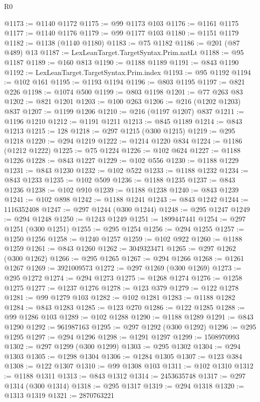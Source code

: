 \begin{lexlean}{R0}
\begin{coremodule}
@1173 := @1140 @1172
@1175 := @99 @1173 @103
@1176 := @1161 @1175
@1177 := @1140 @1176
@1179 := @99 @1177 @103
@1180 := @1151 @1179
@1182 := @1138 (@1140 @1180)
@1183 := @75 @1182
@1186 := @201 (@87 @489) @13
@1187 := LexLeanTarget.TargetSyntax.Prim.natLt
@1188 := @95 @1187
@1189 := @160 @813
@1190 := @1188 @1189
@1191 := @843 @1190
@1192 := LexLeanTarget.TargetSyntax.Prim.index
@1193 := @95 @1192
@1194 := @102 @161
@1195 := @1193 @1194
@1196 := @803 @1195
@1197 := @821 @226
@1198 := @1074 @500
@1199 := @803 @1198
@1201 := @77 @263 @83
@1202 := @821 @1201
@1203 := @100 @263
@1206 := @216 (@1202 @1203) @837
@1207 := @1199 @1206
@1210 := @216 (@1197 @1207) @837
@1211 := @1196 @1210
@1212 := @1191 @1211
@1213 := @845 @1189
@1214 := @843 @1213
@1215 := 128
@1218 := @297 @1215 (@300 @1215)
@1219 := @295 @1218
@1220 := @294 @1219
@1222 := @1214 @1220 @834
@1224 := @1186 (@1212 @1222)
@1225 := @75 @1224
@1226 := @102 @624
@1227 := @1188 @1226
@1228 := @843 @1227
@1229 := @102 @556
@1230 := @1188 @1229
@1231 := @843 @1230
@1232 := @102 @522
@1233 := @1188 @1232
@1234 := @843 @1233
@1235 := @102 @509
@1236 := @1188 @1235
@1237 := @843 @1236
@1238 := @102 @910
@1239 := @1188 @1238
@1240 := @843 @1239
@1241 := @102 @898
@1242 := @1188 @1241
@1243 := @843 @1242
@1244 := 1116352408
@1247 := @297 @1244 (@300 @1244)
@1248 := @295 @1247
@1249 := @294 @1248
@1250 := @1243 @1249
@1251 := 1899447441
@1254 := @297 @1251 (@300 @1251)
@1255 := @295 @1254
@1256 := @294 @1255
@1257 := @1250 @1256
@1258 := @1240 @1257
@1259 := @102 @922
@1260 := @1188 @1259
@1261 := @843 @1260
@1262 := 3049323471
@1265 := @297 @1262 (@300 @1262)
@1266 := @295 @1265
@1267 := @294 @1266
@1268 := @1261 @1267
@1269 := 3921009573
@1272 := @297 @1269 (@300 @1269)
@1273 := @295 @1272
@1274 := @294 @1273
@1275 := @1268 @1274
@1276 := @1258 @1275
@1277 := @1237 @1276
@1278 := @123 @379
@1279 := @122 @1278
@1281 := @99 @1279 @103
@1282 := @102 @1281
@1283 := @1188 @1282
@1284 := @843 @1283
@1285 := @123 @270
@1286 := @122 @1285
@1288 := @99 @1286 @103
@1289 := @102 @1288
@1290 := @1188 @1289
@1291 := @843 @1290
@1292 := 961987163
@1295 := @297 @1292 (@300 @1292)
@1296 := @295 @1295
@1297 := @294 @1296
@1298 := @1291 @1297
@1299 := 1508970993
@1302 := @297 @1299 (@300 @1299)
@1303 := @295 @1302
@1304 := @294 @1303
@1305 := @1298 @1304
@1306 := @1284 @1305
@1307 := @123 @384
@1308 := @122 @1307
@1310 := @99 @1308 @103
@1311 := @102 @1310
@1312 := @1188 @1311
@1313 := @843 @1312
@1314 := 2453635748
@1317 := @297 @1314 (@300 @1314)
@1318 := @295 @1317
@1319 := @294 @1318
@1320 := @1313 @1319
@1321 := 2870763221

\end{coremodule}
\end{lexlean}
